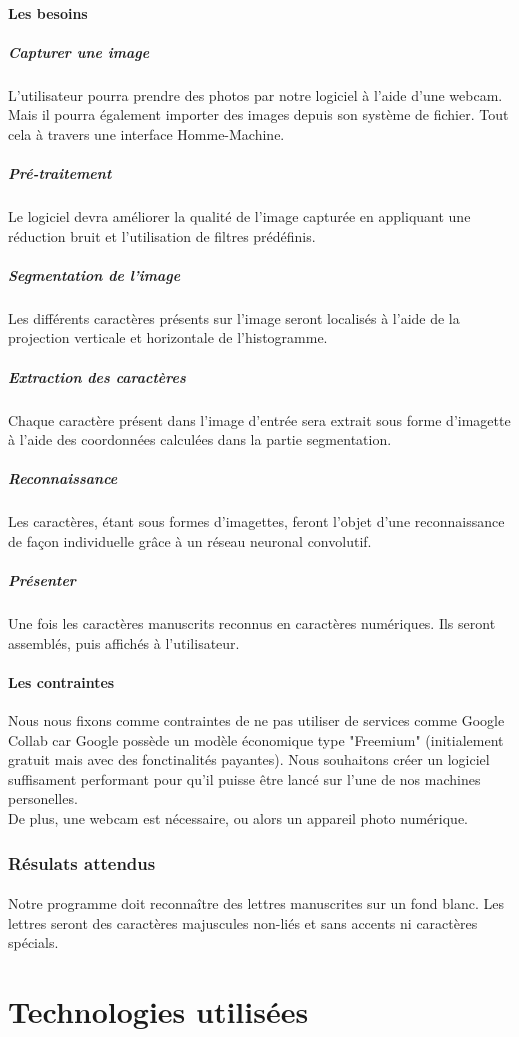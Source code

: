 \documentclass[a4paper]{article}
\begin{document}
				\paragraph{Les besoins}
					\subparagraph{Capturer une image}
						L'utilisateur pourra prendre des photos par notre logiciel à l'aide d'une webcam. Mais il pourra également importer des images depuis son système de fichier. Tout cela à travers une interface Homme-Machine.
					\subparagraph{Pré-traitement}
						Le logiciel devra améliorer la qualité de l'image capturée en appliquant une réduction bruit et l'utilisation de filtres prédéfinis. 
					\subparagraph{Segmentation de l'image}
						Les différents caractères présents sur l'image seront localisés à l'aide de la projection verticale et horizontale de l'histogramme.
					\subparagraph{Extraction des caractères}
						Chaque caractère présent dans l'image d'entrée sera extrait sous forme d'imagette à l'aide des coordonnées calculées dans la partie segmentation.  
					\subparagraph{Reconnaissance}
						Les caractères, étant sous formes d'imagettes, feront l'objet d'une reconnaissance de façon individuelle grâce à un réseau neuronal convolutif.  
					\subparagraph{Présenter}
						Une fois les caractères manuscrits reconnus en caractères numériques. Ils seront assemblés, puis affichés à l'utilisateur.
				\paragraph{Les contraintes}
					Nous nous fixons comme contraintes de ne pas utiliser de services comme Google Collab car Google possède un modèle économique type "Freemium" (initialement gratuit mais avec des fonctinalités payantes). Nous souhaitons créer un logiciel suffisament performant pour qu'il puisse être lancé sur l'une de nos machines personelles. \\De plus, une webcam est nécessaire, ou alors un appareil photo numérique.
			\subsubsection{Résulats attendus}
				\paragraph{}
					Notre programme doit reconnaître des lettres manuscrites sur un fond blanc. Les lettres seront des caractères majuscules non-liés et sans accents ni caractères spécials.
	\section{Technologies utilisées} 
\end{document}
